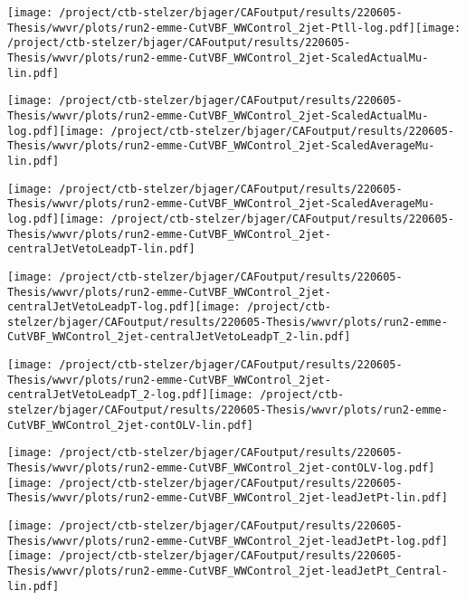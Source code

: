\documentclass{article}
\begin{document}
\texttt{[image: /project/ctb-stelzer/bjager/CAFoutput/results/220605-Thesis/wwvr/plots/run2-emme-CutVBF\_WWControl\_2jet-Ptll-log.pdf]}\texttt{[image: /project/ctb-stelzer/bjager/CAFoutput/results/220605-Thesis/wwvr/plots/run2-emme-CutVBF\_WWControl\_2jet-ScaledActualMu-lin.pdf]}

\texttt{[image: /project/ctb-stelzer/bjager/CAFoutput/results/220605-Thesis/wwvr/plots/run2-emme-CutVBF\_WWControl\_2jet-ScaledActualMu-log.pdf]}\texttt{[image: /project/ctb-stelzer/bjager/CAFoutput/results/220605-Thesis/wwvr/plots/run2-emme-CutVBF\_WWControl\_2jet-ScaledAverageMu-lin.pdf]}

\texttt{[image: /project/ctb-stelzer/bjager/CAFoutput/results/220605-Thesis/wwvr/plots/run2-emme-CutVBF\_WWControl\_2jet-ScaledAverageMu-log.pdf]}\texttt{[image: /project/ctb-stelzer/bjager/CAFoutput/results/220605-Thesis/wwvr/plots/run2-emme-CutVBF\_WWControl\_2jet-centralJetVetoLeadpT-lin.pdf]}

\texttt{[image: /project/ctb-stelzer/bjager/CAFoutput/results/220605-Thesis/wwvr/plots/run2-emme-CutVBF\_WWControl\_2jet-centralJetVetoLeadpT-log.pdf]}\texttt{[image: /project/ctb-stelzer/bjager/CAFoutput/results/220605-Thesis/wwvr/plots/run2-emme-CutVBF\_WWControl\_2jet-centralJetVetoLeadpT\_2-lin.pdf]}

\texttt{[image: /project/ctb-stelzer/bjager/CAFoutput/results/220605-Thesis/wwvr/plots/run2-emme-CutVBF\_WWControl\_2jet-centralJetVetoLeadpT\_2-log.pdf]}\texttt{[image: /project/ctb-stelzer/bjager/CAFoutput/results/220605-Thesis/wwvr/plots/run2-emme-CutVBF\_WWControl\_2jet-contOLV-lin.pdf]}

\texttt{[image: /project/ctb-stelzer/bjager/CAFoutput/results/220605-Thesis/wwvr/plots/run2-emme-CutVBF\_WWControl\_2jet-contOLV-log.pdf]}\texttt{[image: /project/ctb-stelzer/bjager/CAFoutput/results/220605-Thesis/wwvr/plots/run2-emme-CutVBF\_WWControl\_2jet-leadJetPt-lin.pdf]}

\texttt{[image: /project/ctb-stelzer/bjager/CAFoutput/results/220605-Thesis/wwvr/plots/run2-emme-CutVBF\_WWControl\_2jet-leadJetPt-log.pdf]}\texttt{[image: /project/ctb-stelzer/bjager/CAFoutput/results/220605-Thesis/wwvr/plots/run2-emme-CutVBF\_WWControl\_2jet-leadJetPt\_Central-lin.pdf]}
\end{document}

